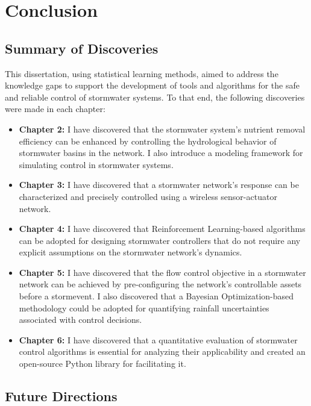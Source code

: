 \chapter{Conclusion}\label{ch:conclusion}
\section{Summary of Discoveries}

This dissertation, using statistical learning methods, aimed to address the knowledge gaps to support the development of tools and algorithms for the safe and reliable control of stormwater systems.
To that end, the following discoveries were made in each chapter:

\begin{itemize}
	\item \textbf{Chapter 2:} I have discovered that the stormwater system's nutrient removal efficiency can be enhanced by controlling the hydrological behavior of stormwater basins in the network. I also introduce a modeling framework for simulating control in stormwater systems.
	\item \textbf{Chapter 3:} I have discovered that a stormwater network's response can be characterized and precisely controlled using a wireless sensor-actuator network.  
	\item \textbf{Chapter 4:} I have discovered that Reinforcement Learning-based algorithms can be adopted for designing stormwater controllers that do not require any explicit assumptions on the stormwater network's dynamics.
	\item \textbf{Chapter 5:} I have discovered that the flow control objective in a stormwater network can be achieved by pre-configuring the network's controllable assets before a stormevent. I also discovered that a Bayesian Optimization-based methodology could be adopted for quantifying rainfall uncertainties associated with control decisions. 
	\item \textbf{Chapter 6:} I have discovered that a quantitative evaluation of stormwater control algorithms is essential for analyzing their applicability and created an open-source Python library for facilitating it. 
\end{itemize}

\section{Future Directions}


